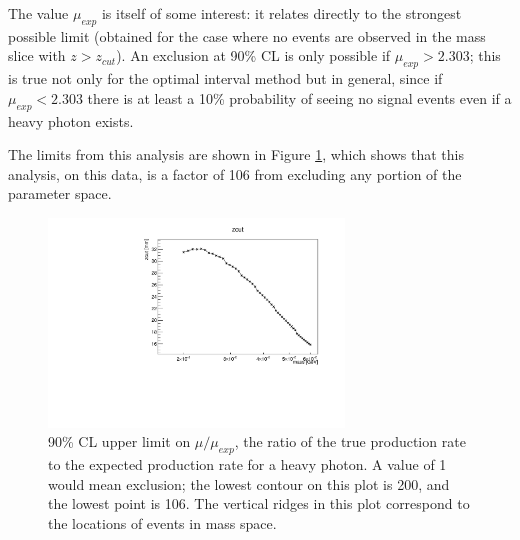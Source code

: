 The value $\mu_{exp}$ is itself of some interest: it relates directly to the strongest possible limit (obtained for the case where no events are observed in the mass slice with $z>z_{cut}$).
An exclusion at 90\% CL is only possible if $\mu_{exp}>2.303$; this is true not only for the optimal interval method but in general, since if $\mu_{exp}<2.303$ there is at least a 10\% probability of seeing no signal events even if a heavy photon exists.

The limits from this analysis are shown in Figure \ref{fig:upper_limit}, which shows that this analysis, on this data, is a factor of 106 from excluding any portion of the parameter space.

\begin{figure}[ht]
\begin{center}
    \includegraphics[width=0.7\textwidth,page=15,angle=-90]{vertexing/figs/golden_mres_output}
\end{center}
    \caption{90\% CL upper limit on $\mu/\mu_{exp}$, the ratio of the true production rate to the expected production rate for a heavy photon. A value of 1 would mean exclusion; the lowest contour on this plot is 200, and the lowest point is 106.
    The vertical ridges in this plot correspond to the locations of events in mass space.}
    \label{fig:upper_limit}
\end{figure}

